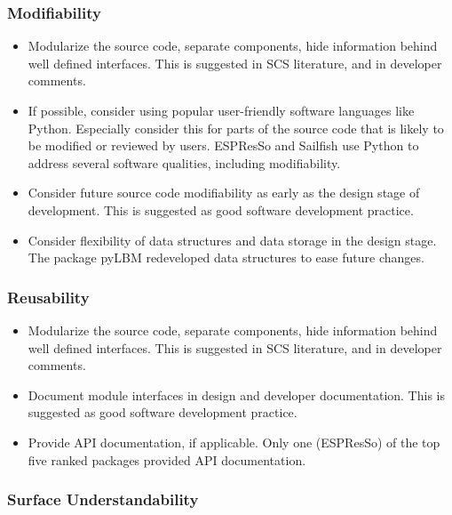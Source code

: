 \documentclass[final, 3p, times, authoryear]{elsarticle}
\begin{document}
\subsubsection{Modifiability}

\begin{itemize}
	\item Modularize the source code, separate components, hide information
	behind well defined interfaces. This is suggested in SCS literature, and in
	developer comments.
	\item If possible, consider using popular user-friendly software languages
	like Python. Especially consider this for parts of the source code that is
	likely to be modified or reviewed by users. ESPResSo and Sailfish use Python
	to address several software qualities, including modifiability.
	\item Consider future source code modifiability as early as the design stage
	of development. This is suggested as good software development practice.
	\item Consider flexibility of data structures and data storage in the design
	stage. The package pyLBM redeveloped data structures to ease future changes.
\end{itemize}

\subsubsection{Reusability}

\begin{itemize}
	\item Modularize the source code, separate components, hide information
	behind well defined interfaces. This is suggested in SCS literature, and in
	developer comments.
	\item Document module interfaces in design and developer documentation. This
	is suggested as good software development practice.
	\item Provide API documentation, if applicable. Only one (ESPResSo) of the
	top five ranked packages provided API documentation.
\end{itemize}

\subsubsection{Surface Understandability}
\end{document}
